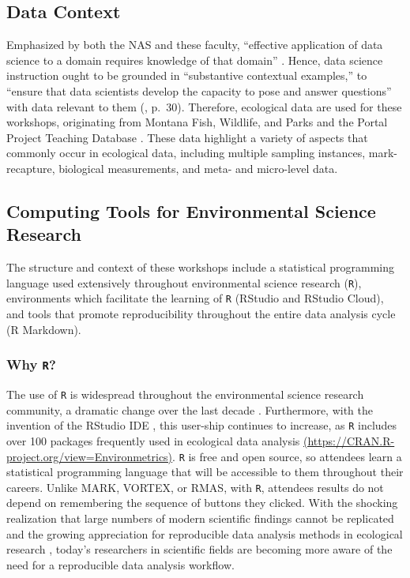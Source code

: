 \documentclass[12pt]{article}
\begin{document}

\subsection{Data Context}  

\quad Emphasized by both the NAS and these faculty, ``effective application of
data science to a domain requires knowledge of that domain'' \citep[p.\ 29]{nas}. 
Hence, data science instruction ought to be grounded in ``substantive contextual
examples,'' to ``ensure that data scientists develop the capacity to pose and
answer questions'' with data relevant to them (\citeyear{nas}, p.\ 30). 
Therefore, ecological data are used for these workshops, originating from 
Montana Fish, Wildlife, and Parks and the Portal Project Teaching Database 
\citep{portal_data}. These data highlight a variety of aspects that
commonly occur in ecological data, including multiple sampling instances,
mark-recapture, biological measurements, and meta- and micro-level data. 

\subsection{Computing Tools for Environmental Science Research}  

\quad The structure and context of these workshops include a statistical
programming language used extensively throughout environmental science research
(\texttt{R}), environments which facilitate the learning of \texttt{R}
(RStudio and RStudio Cloud), and tools that promote reproducibility throughout
the entire data analysis cycle (R Markdown).

\subsubsection{Why \texttt{R}?} 

\quad The use of \texttt{R} is widespread throughout the environmental science
research community, a dramatic change over the last decade \citep{Rpopular}. 
Furthermore, with the invention of the RStudio IDE \citep{rstudio}, this
user-ship continues to increase, as \texttt{R} includes over 100 packages
frequently used in ecological data analysis \href{https://CRAN.R-project.org/view=Environmetrics}{(https://CRAN.R-project.org/view=Environmetrics)}. \texttt{R} is free and open source, so
attendees learn a statistical programming language that will be accessible to
them throughout their careers. Unlike MARK, VORTEX, or RMAS, with \texttt{R}, 
attendees results do not depend on remembering the sequence of buttons they
clicked. With the shocking realization that large numbers of modern scientific
findings cannot be replicated \citep{economist, johnson} and the growing
appreciation for reproducible data analysis methods in ecological research
\citep{reproducibilty-comment, repeatability, pva, reproducibility_ecology},
today's researchers in scientific fields are becoming more aware of the need for
a reproducible data analysis workflow. 
\end{document}
